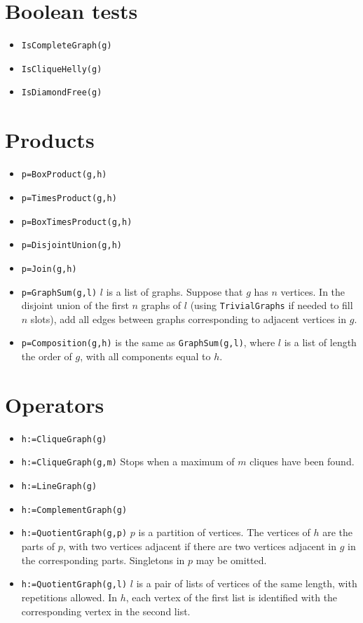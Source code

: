 \documentclass[11pt]{article}
\begin{document}
\begin{multicols}{3}
\section{Boolean tests}
\label{sec:orgheadline7}
\begin{itemize}
\item \texttt{IsCompleteGraph(g)}
\item \texttt{IsCliqueHelly(g)}
\item \texttt{IsDiamondFree(g)}
\end{itemize}
\section{Products}
\label{sec:orgheadline8}
\begin{itemize}
\item \texttt{p=BoxProduct(g,h)}
\item \texttt{p=TimesProduct(g,h)}
\item \texttt{p=BoxTimesProduct(g,h)}
\item \texttt{p=DisjointUnion(g,h)}
\item \texttt{p=Join(g,h)}
\item \texttt{p=GraphSum(g,l)} \(l\) is a list of graphs. Suppose that \(g\) has
\(n\) vertices. In the disjoint union of the first \(n\) graphs of
\(l\) (using \texttt{TrivialGraphs} if needed to fill \(n\) slots), add all
edges between graphs corresponding to adjacent vertices in \(g\).
\item \texttt{p=Composition(g,h)} is the same as \texttt{GraphSum(g,l)}, where \(l\) is
a list of length the order of \(g\), with all components equal to
\(h\).
\end{itemize}

\section{Operators}
\label{sec:orgheadline9}

\begin{itemize}
\item \texttt{h:=CliqueGraph(g)}
\item \texttt{h:=CliqueGraph(g,m)} Stops when a maximum of
\(m\) cliques have been found.
\item \texttt{h:=LineGraph(g)}
\item \texttt{h:=ComplementGraph(g)}
\item \texttt{h:=QuotientGraph(g,p)} \(p\) is a partition of vertices. The
vertices of \(h\) are the parts of \(p\), with two vertices adjacent
if there are two vertices adjacent in \(g\) in the corresponding
parts. Singletons in \(p\) may be omitted.
\item \texttt{h:=QuotientGraph(g,l)} \(l\) is a pair of lists of vertices of the
same length, with repetitions allowed. In \(h\), each vertex of the
first list is identified with the corresponding vertex in the second
list.
\end{itemize}


\end{multicols}
\end{document}
